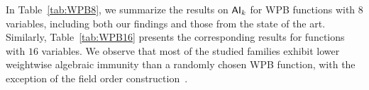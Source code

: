 \documentclass[11pt]{llncs}
\begin{document}
In Table~\ref{tab:WPB8}, we summarize the results on $\AIk{k}$ for WPB functions with $8$ variables, including both our findings and those from the state of the art.  
Similarly, Table~\ref{tab:WPB16} presents the corresponding results for functions with $16$ variables.  
We observe that most of the studied families exhibit lower weightwise algebraic immunity than a randomly chosen WPB function, with the exception of the field order construction~\cite{SAC:Meaux24}.  


\begin{table}[H]
	\center 
	\caption{$\AIk{k}$ of WPB functions in $8$ variables.}
	\label{tab:WPB8}
\end{table}
\end{document}
